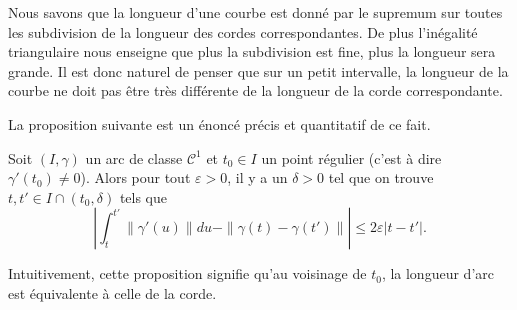 Nous savons que la longueur d'une courbe est donné par le supremum sur toutes les subdivision de la longueur des cordes correspondantes. De plus l'inégalité triangulaire nous enseigne que plus la subdivision est fine, plus la longueur sera grande. Il est donc naturel de penser que sur un petit intervalle, la longueur de la courbe ne doit pas être très différente de la longueur de la corde correspondante. 

La proposition suivante est un énoncé précis et quantitatif de ce fait.
\begin{proposition}
    Soit $(I,\gamma)$ un arc de classe $\mathcal{C}^1$ et $t_0\in I$ un point régulier (c'est à dire $\gamma'(t_0)\neq 0$). Alors pour tout $\varepsilon>0$, il y a un $\delta>0$ tel que on trouve  $t,t'\in I\cap(t_0,\delta)$ tels que
    \begin{equation}
        \left| \int_t^{t'}\| \gamma'(u) \|du-\| \gamma(t)-\gamma(t') \| \right| \leq 2\varepsilon| t-t' |.
    \end{equation}
\end{proposition}
Intuitivement, cette proposition signifie qu'au voisinage de $t_0$, la longueur d'arc est équivalente à celle de la corde. 

